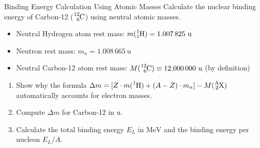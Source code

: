 \begin{exercise}{Binding Energy Calculation Using Atomic Masses}
Calculate the nuclear binding energy of Carbon-12 ($\ce{^{12}_{6}C}$) using neutral atomic masses.
\begin{itemize}[itemsep=1pt]
  \item Neutral Hydrogen atom rest mass: $m(\ce{^{1}_{1}H}) = 1.007\,825\ \mathrm{u}$
  \item Neutron rest mass: $m_n = 1.008\,665\ \mathrm{u}$
  \item Neutral Carbon-12 atom rest mass: $M(\ce{^{12}_{6}C}) \equiv 12.000\,000\ \mathrm{u}$ (by definition)
\end{itemize}
\begin{enumerate}[leftmargin=1.5em,itemsep=2pt]
  \item Show why the formula $\Delta m = [Z \cdot m(\ce{^1H}) + (A - Z) \cdot m_n] - M(\ce{^{A}_{Z}X})$ automatically accounts for electron masses.
  \item Compute $\Delta m$ for Carbon-12 in $\mathrm{u}$.
  \item Calculate the total binding energy $E_L$ in $\mathrm{MeV}$ and the binding energy per nucleon $E_L/A$.
\end{enumerate}
\end{exercise}

\begin{tabletworkspace}[5.0cm]
\end{tabletworkspace}

